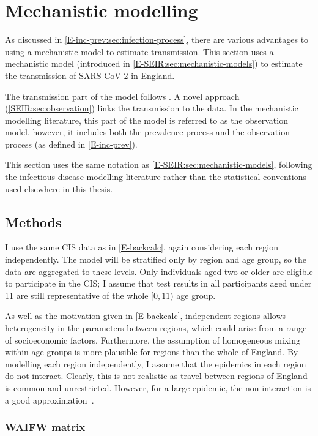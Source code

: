 \documentclass[thesis.tex]{subfiles}
\begin{document}
\section{Mechanistic modelling} \label{SEIR}

As discussed in \cref{E-inc-prev:sec:infection-process}, there are various advantages to using a mechanistic model to estimate transmission.
This section uses a mechanistic model (introduced in \cref{E-SEIR:sec:mechanistic-models}) to estimate the transmission of SARS-CoV-2 in England.

The transmission part of the model follows \textcite{birrellRealtime}.
A novel approach (\cref{SEIR:sec:observation}) links the transmission to the data.
In the mechanistic modelling literature, this part of the model is referred to as the observation model, however, it includes both the prevalence process and the observation process (as defined in \cref{E-inc-prev}).

This section uses the same notation as \cref{E-SEIR:sec:mechanistic-models}, following the infectious disease modelling literature rather than the statistical conventions used elsewhere in this thesis.

\subsection{Methods}

I use the same CIS data as in \cref{E-backcalc}, again considering each region independently.
The model will be stratified only by region and age group, so the data are aggregated to these levels.
Only individuals aged two or older are eligible to participate in the CIS; I assume that test results in all participants aged under 11 are still representative of the whole $[0, 11)$ age group.

As well as the motivation given in \cref{E-backcalc}, independent regions allows heterogeneity in the parameters between regions, which could arise from a range of socioeconomic factors.
Furthermore, the assumption of homogeneous mixing within age groups is more plausible for regions than the whole of England.
By modelling each region independently, I assume that the epidemics in each region do not interact.
Clearly, this is not realistic as travel between regions of England is common and unrestricted.
However, for a large epidemic, the non-interaction is a good approximation~\autocite{birrellRealtimea}.

\subsubsection{WAIFW matrix}
\end{document}
